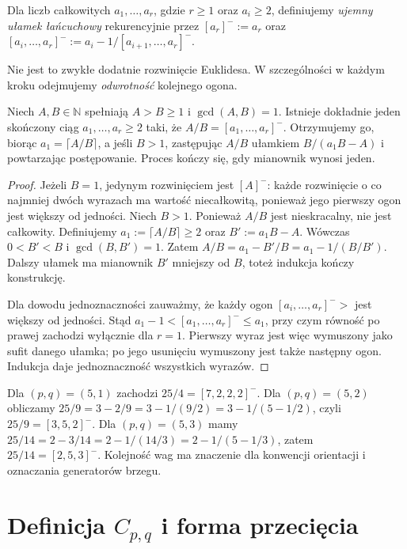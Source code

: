 \begin{definicja}
Dla liczb całkowitych $a_1,\ldots,a_r$, gdzie $r\geq1$ oraz
$a_i\geq2$, definiujemy \emph{ujemny ułamek łańcuchowy}
rekurencyjnie przez $[a_r]^-:=a_r$ oraz
$[a_i,\ldots,a_r]^-:=a_i-1/[a_{i+1},\ldots,a_r]^-$.
\end{definicja}

Nie jest to zwykłe dodatnie rozwinięcie Euklidesa. W szczególności
w każdym kroku odejmujemy \emph{odwrotność} kolejnego ogona.

\begin{twierdzenie}
\label{thm:tg-cf-algorithm}
Niech $A,B\in\mathbb N$ spełniają $A>B\geq1$ i
$\gcd(A,B)=1$. Istnieje dokładnie jeden skończony ciąg
$a_1,\ldots,a_r\geq2$ taki, że $A/B=[a_1,\ldots,a_r]^-$. 
Otrzymujemy go, biorąc $a_1=\lceil A/B\rceil$, a jeśli
$B>1$, zastępując $A/B$ ułamkiem $B/(a_1B-A)$ i powtarzając
postępowanie. Proces kończy się, gdy mianownik wynosi jeden.
\end{twierdzenie}

\begin{proof}
Jeżeli $B=1$, jedynym rozwinięciem jest $[A]^-$: każde
rozwinięcie o co najmniej dwóch wyrazach ma wartość niecałkowitą,
ponieważ jego pierwszy ogon jest większy od jedności. Niech
$B>1$. Ponieważ $A/B$ jest nieskracalny, nie jest całkowity.
Definiujemy $a_1:=\lceil A/B\rceil\geq2$ oraz
$B':=a_1B-A$. Wówczas $0<B'<B$ i $\gcd(B,B')=1$.
Zatem
$A/B=a_1-B'/B=a_1-1/(B/B')$.
Dalszy ułamek ma mianownik $B'$ mniejszy od $B$, toteż
indukcja kończy konstrukcję.

Dla dowodu jednoznaczności zauważmy, że każdy ogon
$[a_i,\ldots,a_r]^->$ jest większy od jedności. Stąd
$a_1-1<[a_1,\ldots,a_r]^-\leq a_1$, przy czym równość
po prawej zachodzi wyłącznie dla $r=1$.
Pierwszy wyraz jest więc wymuszony jako sufit danego ułamka;
po jego usunięciu wymuszony jest także następny ogon.
Indukcja daje jednoznaczność wszystkich wyrazów.
\end{proof}

\begin{przyklad}
Dla $(p,q)=(5,1)$ zachodzi $25/4=[7,2,2,2]^-$.
Dla $(p,q)=(5,2)$ obliczamy
$25/9=3-2/9=3-1/(9/2)=3-1/(5-1/2)$, czyli
$25/9=[3,5,2]^-$. Dla $(p,q)=(5,3)$ mamy
$25/14=2-3/14=2-1/(14/3)=2-1/(5-1/3)$,
zatem $25/14=[2,5,3]^-$. Kolejność wag ma znaczenie dla
konwencji orientacji i oznaczania generatorów brzegu.
\end{przyklad}

\section{Definicja \texorpdfstring{$C_{p,q}$}{Cpq} i forma przecięcia}
\label{sec:tg-general-config}

